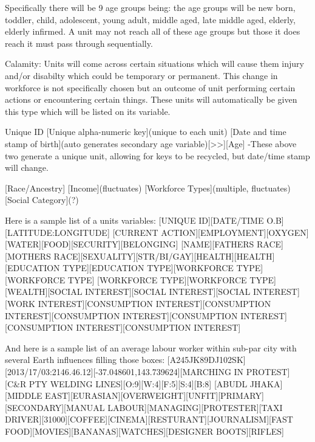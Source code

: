 Specifically there will be 9 age groups being: the age groups will be new born, toddler, child, adolescent, young adult, middle aged, late middle aged, elderly, elderly infirmed. A unit may not reach all of these age groups but those it does reach it must pass through sequentially.


Calamity:
Units will come across certain situations which will cause them injury and/or disabilty which could be temporary or permanent. This change in workforce is not specifically chosen but an outcome of unit performing certain actions or encountering certain things. These units will automatically be given this type which will be listed on its variable.  



Unique ID
[Unique alpha-numeric key](unique to each unit)
[Date and time stamp of birth](auto generates secondary age variable)[>>][Age]
-These above two generate a unique unit, allowing for keys to be recycled, but date/time stamp will change.

[Race/Ancestry]
[Income](fluctuates)
[Workforce Types](multiple, fluctuates)
[Social Category](?)


Here is a sample list of a units variables:
[UNIQUE ID][DATE/TIME O.B][LATITUDE:LONGITUDE]
[CURRENT ACTION][EMPLOYMENT][OXYGEN][WATER][FOOD][SECURITY][BELONGING]
[NAME][FATHERS RACE][MOTHERS RACE][SEXUALITY][STR/BI/GAY][HEALTH][HEALTH][EDUCATION TYPE][EDUCATION TYPE][WORKFORCE TYPE][WORKFORCE TYPE]
[WORKFORCE TYPE][WORKFORCE TYPE][WEALTH][SOCIAL INTEREST][SOCIAL INTEREST][SOCIAL INTEREST][WORK INTEREST][CONSUMPTION INTEREST][CONSUMPTION INTEREST][CONSUMPTION INTEREST][CONSUMPTION INTEREST][CONSUMPTION INTEREST][CONSUMPTION INTEREST]

And here is a sample list of an average labour worker within sub-par city with several Earth influences filling those boxes:
[A245JK89DJ102SK][2013/17/03:2146.46.12][-37.048601,143.739624][MARCHING IN PROTEST][C&R PTY WELDING LINES][O:9][W:4][F:5][S:4][B:8]
[ABUDL JHAKA][MIDDLE EAST][EURASIAN][OVERWEIGHT][UNFIT][PRIMARY][SECONDARY][MANUAL LABOUR][MANAGING][PROTESTER][TAXI DRIVER][31000][COFFEE][CINEMA][RESTURANT][JOURNALISM][FAST FOOD][MOVIES][BANANAS][WATCHES][DESIGNER BOOTS][RIFLES]



